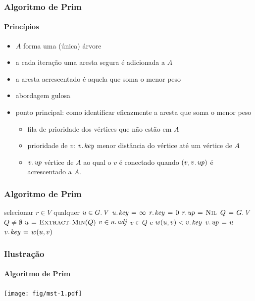 \documentclass{beamer}
\begin{document}
\begin{frame}
\frametitle{Algoritmo de Prim}
\framesubtitle{Princípios}

\begin{itemize}
\item $A$ forma uma (única) árvore
\item a cada iteração uma aresta segura é adicionada a $A$
\item a aresta acrescentado é aquela que soma o menor peso
\item abordagem gulosa
\item ponto principal: como identificar eficazmente a aresta que soma o menor peso
\begin{itemize}
\item fila de prioridade dos vértices que não estão em $A$
\item prioridade de $v$: $\attrib{v}{key}$ menor distância do vértice até um vértice de $A$
\item $\attrib{v}{up}$ vértice de $A$ ao qual o $v$ é conectado quando
  $(v,\attrib{v}{up})$ é acrescentado a $A$.
\end{itemize}
\end{itemize}

\end{frame}

\begin{frame}
\frametitle{Algoritmo de Prim}

\begin{codebox}
\li selecionar $r \in V$ qualquer
\li \For $u \in \attrib{G}{V}$
\li \Do $\attrib{u}{key} \gets \infty$
    \End
\li $\attrib{r}{key} \gets 0$
\li $\attrib{r}{up} \gets \const{Nil}$
\li $Q \gets \attrib{G}{V}$
\li \While $Q \neq \emptyset$
\li \Do $u \mathrel{\hspace{1pt}=\hspace{1pt}} \textnormal{\scshape Extract-Min}(Q)$
\li   \For $v \in \attrib{u}{adj}$
\li   \Do \If $v \in Q$ e $w(u, v) < \attrib{v}{key}$
\li     \Then $\attrib{v}{up} \gets u$
\li       $\attrib{v}{key} \gets w(u, v)$
        \End
      \End
    \End
\end{codebox}

\end{frame}

\begin{frame}
\frametitle{Ilustração}
\framesubtitle{Algoritmo de Prim}

\begin{center}
\texttt{[image: fig/mst-1.pdf]}
\end{center}

\end{frame}
\end{document}
